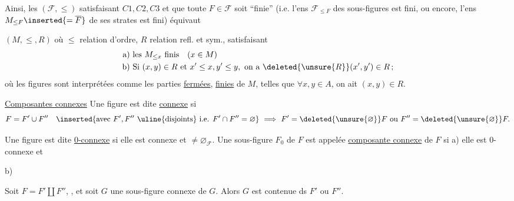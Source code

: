  Ainsi, les  $(\mathcal F,\leq)$ satisfaisant $C1,C2,C3$ et  que toute $F\in\mathcal F$ soit ``finie'' (i.e. l'ens $\mathcal F_{\leq F}$ des sous-figures est fini, ou encore, l'ens $M_{\leq F}\inserted{=\overline F}$  de  ses strates est fini) équivaut 

$(M,\leq,R)$  où $\leq$ relation d'ordre, $R$ relation refl. et sym., satisfaisant
\[
\begin{aligned}
\text{a) }&\text{les }M_{\leq x}\text{ finis}\quad(x\in M)\\
\text{b) }&\text{Si }(x,y)\in R\text{ et }x'\leq x,y'\leq y,\ \text{on a }\deleted{\unsure{R}}(x',y')\in R\,;
\end{aligned}
\]
où les figures sont interprétées comme les parties \uline{fermées}, \uline{finies}  de $M$, telles que $\forall x,y\in A$, on ait $(x,y)\in R$.


\uline{Composantes connexes} Une figure est dite \uline{connexe} si 
\[
F=F'\cup F''\quad
\inserted{\text{avec }F',F''\ \text{\uline{disjoints} i.e. }F'\cap F''=\varnothing}
\ \Longrightarrow\ F'=\deleted{\unsure{\varnothing}}F\ \text{ou }F''=\deleted{\unsure{\varnothing}}F.
\]


Une figure est dite \uline{0-connexe} si elle est connexe et $\ne\varnothing_{\mathcal F}$. Une sous-figure $F_0$ de $F$ est appelée \uline{composante connexe} de $F$ si a) elle est 0-connexe et

b)   

  Soit $F=F'\amalg F''$, , et soit $G$ une sous-figure connexe de $G$. Alors $G$ est contenue ds $F'$ ou $F''$.
